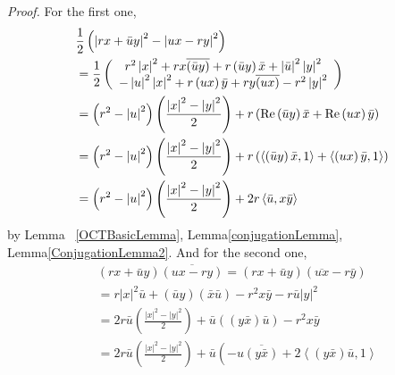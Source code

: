 \documentclass[a4paper]{article}%
\newenvironment{proof}[1][Proof]{\noindent\textit{#1.} }{}
\begin{document}
\begin{proof}
For the first one,%
\begin{align*}
&  \frac{1}{2}\left(  \left\vert rx+\bar{u}y\right\vert ^{2}-\left\vert
ux-ry\right\vert ^{2}\right) \\
&  =\frac{1}{2}\left(
\begin{array}
[c]{c}%
r^{2}\left\vert x\right\vert ^{2}+rx\overline{\left(  \bar{u}y\right)
}+r\left(  \bar{u}y\right)  \bar{x}+\left\vert \bar{u}\right\vert
^{2}\left\vert y\right\vert ^{2}\\
-\left\vert u\right\vert ^{2}\left\vert x\right\vert ^{2}+r\left(  ux\right)
\bar{y}+ry\overline{\left(  ux\right)  }-r^{2}\left\vert y\right\vert ^{2}%
\end{array}
\right) \\
&  =\left(  r^{2}-\left\vert u\right\vert ^{2}\right)  \left(  \frac
{\left\vert x\right\vert ^{2}-\left\vert y\right\vert ^{2}}{2}\right)
+r\left(  \operatorname{Re}\left(  \bar{u}y\right)  \bar{x}+\operatorname{Re}%
\left(  ux\right)  \bar{y}\right) \\
&  =\left(  r^{2}-\left\vert u\right\vert ^{2}\right)  \left(  \frac
{\left\vert x\right\vert ^{2}-\left\vert y\right\vert ^{2}}{2}\right)
+r\left(  \left\langle \left(  \bar{u}y\right)  \bar{x},1\right\rangle
+\left\langle \left(  ux\right)  \bar{y},1\right\rangle \right) \\
&  =\left(  r^{2}-\left\vert u\right\vert ^{2}\right)  \left(  \frac
{\left\vert x\right\vert ^{2}-\left\vert y\right\vert ^{2}}{2}\right)
+2r\left\langle \bar{u},x\bar{y}\right\rangle
\end{align*}
by Lemma \ \ref{OCTBasicLemma}, Lemma\ref{conjugationLemma},
Lemma\ref{ConjugationLemma2}. And for the second one,%
\begin{align*}
&  \left(  rx+\bar{u}y\right)  \overline{\left(  ux-ry\right)  }=\left(
rx+\bar{u}y\right)  \left(  \overline{ux}-r\bar{y}\right) \\
&  =r\left\vert x\right\vert ^{2}\bar{u}+\left(  \bar{u}y\right)  \left(
\bar{x}\bar{u}\right)  -r^{2}x\bar{y}-r\bar{u}\left\vert y\right\vert ^{2}\\
&  =2r\bar{u}\left(  \frac{\left\vert x\right\vert ^{2}-\left\vert
y\right\vert ^{2}}{2}\right)  +\bar{u}\left(  \left(  y\bar{x}\right)  \bar
{u}\right)  -r^{2}x\bar{y}\\
&  =2r\bar{u}\left(  \frac{\left\vert x\right\vert ^{2}-\left\vert
y\right\vert ^{2}}{2}\right)  +\bar{u}\left(  -u\overline{\left(  y\bar
{x}\right)  }+2\left\langle \left(  y\bar{x}\right)  \bar{u},1\right\rangle

\end{align*}
\end{proof}
\end{document}
